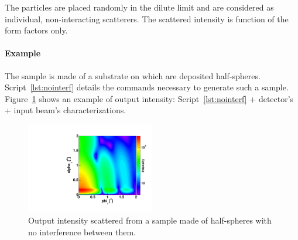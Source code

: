 \newpage
\subsubsection{ } 
The particles are placed randomly in the dilute limit and are considered as individual, non-interacting scatterers. The scattered intensity is function of the form factors only. 

\paragraph{Example} The sample is made of a substrate on which are deposited half-spheres. Script~\ref{lst:nointerf} details the commands necessary to generate such a sample. Figure~\ref{fig:nointerf} shows an example of output intensity: Script~\ref{lst:nointerf}  + detector's + input beam's characterizations.


\begin{figure}[ht]
\begin{center}
\includegraphics[angle=-90,width=0.5\textwidth]{Figures/gisasmap/HSphere_NoInterf.pdf}
\end{center}
\caption{Output intensity scattered from a sample made of half-spheres with no interference between them.}
\label{fig:nointerf}
\end{figure}

\FloatBarrier
\newpage

